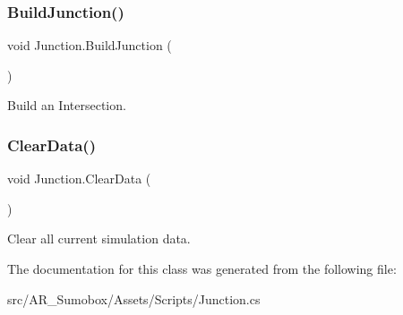 \subsubsection{\texorpdfstring{BuildJunction()}{BuildJunction()}}
{\footnotesize\ttfamily void Junction.\+Build\+Junction (\begin{DoxyParamCaption}{ }\end{DoxyParamCaption})}



Build an Intersection. 

\mbox{\label{class_junction_a57e3c911fbcf14d45b861fcce0d717aa}} 
\subsubsection{\texorpdfstring{ClearData()}{ClearData()}}
{\footnotesize\ttfamily void Junction.\+Clear\+Data (\begin{DoxyParamCaption}{ }\end{DoxyParamCaption})}



Clear all current simulation data. 



The documentation for this class was generated from the following file\+:\begin{DoxyCompactItemize}
\item 
src/\+A\+R\+\_\+\+Sumobox/\+Assets/\+Scripts/Junction.\+cs\end{DoxyCompactItemize}

